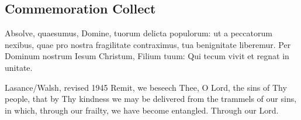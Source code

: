 \subsection{Commemoration Collect}
\label{proper-commemoration-collect}
\begin{latinproper}
Absolve, quaesumus, Domine, tuorum delicta populorum: ut a peccatorum nexibus, quae pro nostra fragilitate contraximus, tua benignitate liberemur. Per Dominum nostrum Iesum Christum, Filium tuum: Qui tecum vivit et regnat in unitate.
\end{latinproper}
\begin{englishwitness}{Lasance/Walsh, revised 1945}
Remit, we beseech Thee, O Lord, the sins of Thy people, that by Thy kindness we may be delivered from the trammels of our sins, in which, through our frailty, we have become entangled. Through our Lord.
\end{englishwitness}

